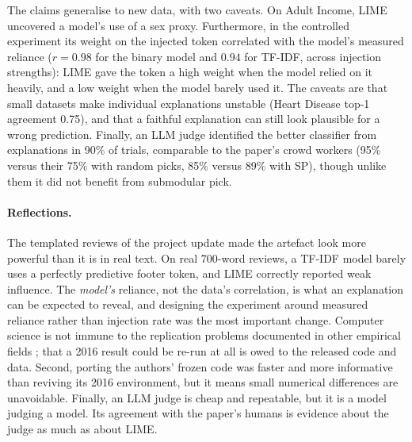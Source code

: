 \documentclass[11pt]{article}
\begin{document}
The claims generalise to new data, with two caveats. On Adult Income, LIME uncovered a model's use of a sex proxy. Furthermore, in the controlled experiment its weight on the injected token correlated with the model’s measured reliance ($r = 0.98$ for the binary model and $0.94$ for TF-IDF, across injection strengths): LIME gave the token a high weight when the model relied on it heavily, and a low weight when the model barely used it. The caveats are that small datasets make individual explanations unstable (Heart Disease top-1 agreement 0.75), and that a faithful explanation can still look plausible for a wrong prediction. Finally, an LLM judge identified the better classifier from explanations in 90\% of trials, comparable to the paper's crowd workers (95\% versus their 75\% with random picks, 85\% versus 89\% with SP), though unlike them it did not benefit from submodular pick.

\paragraph{Reflections.} The templated reviews of the project update made the artefact look more powerful than it is in real text. On real 700-word reviews, a TF-IDF model barely uses a perfectly predictive footer token, and LIME correctly reported weak influence. The \emph{model's} reliance, not the data's correlation, is what an explanation can be expected to reveal, and designing the experiment around measured reliance rather than injection rate was the most important change. Computer science is not immune to the replication problems documented in other empirical fields \citep{cockburn2020threats}; that a 2016 result could be re-run at all is owed to the released code and data. Second, porting the authors' frozen code was faster and more informative than reviving its 2016 environment, but it means small numerical differences are unavoidable. Finally, an LLM judge is cheap and repeatable, but it is a model judging a model. Its agreement with the paper's humans is evidence about the judge as much as about LIME.


\end{document}

